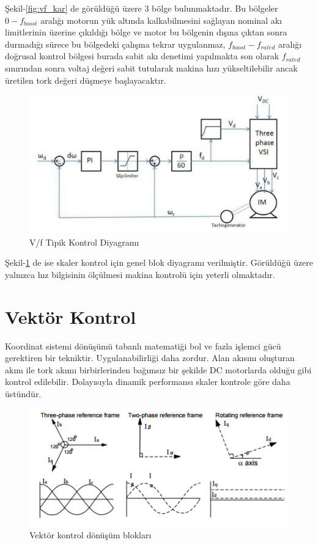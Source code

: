 \documentclass[10pt,a4paper]{article}
\begin{document}
	Şekil-\ref{fig:vf_kar} de görüldüğü üzere 3 bölge bulunmaktadır. Bu bölgeler $0-f_{boost}$ aralığı motorun yük altında kalkabilmesini sağlayan nominal akı limitlerinin üzerine çıkıldığı bölge ve motor bu bölgenin dışına çıktan sonra durmadığı sürece bu bölgedeki çalışma tekrar uygulanmaz, $f_{boost}-f_{rated}$ aralığı doğrusal kontrol bölgesi burada sabit akı denetimi yapılmakta son olarak $f_{rated}$ sınırından sonra voltaj değeri sabit tutularak makina hızı yükseltilebilir ancak üretilen tork değeri düşmeye başlayacaktır.

	\begin{figure}[hp]
		\centering	
		\shorthandoff{=}
		\includegraphics[width=1.0\linewidth]{vf_closed.png}
		\shorthandon{=}	
		\caption{V/f Tipik Kontrol Diyagramı}
		\label{fig:vf_kontrol}
	\end{figure}
	Şekil-\ref{fig:vf_kontrol} de ise skaler kontrol için genel blok diyagramı verilmiştir. Görüldüğü üzere yalnızca hız bilgisinin ölçülmesi makina kontrolü için yeterli olmaktadır.
	
	\section{Vektör Kontrol}
	Koordinat sistemi dönüşümü tabanlı matematiği bol ve fazla işlemci gücü gerektiren bir tekniktir. Uygulanabilirliği daha zordur. Alan akısını oluşturan akım ile tork akımı birbirlerinden bağımsız bir şekilde DC motorlarda olduğu gibi kontrol edilebilir. Dolayısıyla dinamik performansı skaler kontrole göre daha üstündür.
	
	\begin{figure}[hp]
		\centering	
		\shorthandoff{=}
		\includegraphics[width=0.7\linewidth]{clark_park.png}
		\shorthandon{=}	
		\caption{Vektör kontrol dönüşüm blokları}
		\label{fig:clark_park}
	\end{figure}
	
\end{document}
